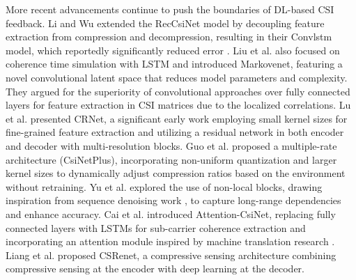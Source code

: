 \documentclass[lettersize,journal]{IEEEtran}
\begin{document}
More recent advancements continue to push the boundaries of DL-based CSI feedback. Li and Wu \cite{abj} extended the RecCsiNet model by decoupling feature extraction from compression and decompression, resulting in their Convlstm model, which reportedly significantly reduced error \cite{abj}. Liu et al. \cite{abk} also focused on coherence time simulation with LSTM and introduced Markovenet, featuring a novel convolutional latent space that reduces model parameters and complexity. They argued for the superiority of convolutional approaches over fully connected layers for feature extraction in CSI matrices due to the localized correlations. Lu et al. \cite{abn} presented CRNet, a significant early work employing small kernel sizes for fine-grained feature extraction and utilizing a residual network in both encoder and decoder with multi-resolution blocks. Guo et al. \cite{abo} proposed a multiple-rate architecture (CsiNetPlus), incorporating non-uniform quantization and larger kernel sizes to dynamically adjust compression ratios based on the environment without retraining. Yu et al. \cite{abq} explored the use of non-local blocks, drawing inspiration from sequence denoising work \cite{abr}, to capture long-range dependencies and enhance accuracy. Cai et al. \cite{abs} introduced Attention-CsiNet, replacing fully connected layers with LSTMs for sub-carrier coherence extraction and incorporating an attention module inspired by machine translation research \cite{abt}. Liang et al. \cite{abm} proposed CSRenet, a compressive sensing architecture combining compressive sensing at the encoder with deep learning at the decoder.
\end{document}
